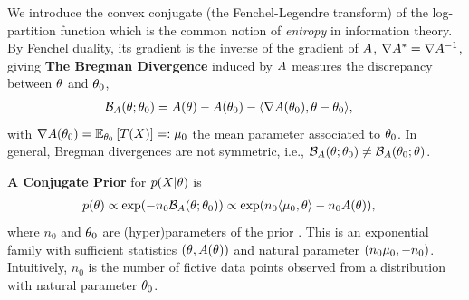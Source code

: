 We introduce the convex conjugate (the Fenchel-Legendre transform) of the log-partition function
which is the common notion of \textit{entropy} in information theory.
By Fenchel duality, its gradient is the inverse of the gradient of $\logpart$,  $\nabla\conj=\nabla\logpart^{-1}$, giving
%
{\bf The Bregman Divergence} induced by $\logpart$ measures the discrepancy between $\nat$ and $\nat_0$,
\begin{align}
    \bregman (\nat ; \nat_0)
    & = \logpart(\nat) - \logpart(\nat_0)
    - \langle \nabla \logpart(\nat_0)  , \nat - \nat_0 \rangle,
    \label{eq:defBregman}
\end{align}
with $\nabla \logpart(\nat_0) = \expect[\nat_0]{T(X)} =: \meanp_0$ the mean parameter associated to $\nat_0$.
In general, Bregman divergences are not symmetric, i.e., $\bregman (\nat ; \nat_0)\neq \bregman (\nat_0 ; \nat)$.

{\bf A Conjugate Prior} for $p(X|\nat)$ is
\begin{align}
    p(\nat)
    &\propto \exp( - n_0 \bregman(\nat ; \nat_0) ) \propto \exp(n_0 \langle \m_0, \nat \rangle - n_0 \logpart(\nat)),
    \label{eq:def_prior}
\end{align}
where $n_0$ and $\nat_0$ are (hyper)parameters of the prior  \citep{agarwal2010geometric}.
This is an exponential family with sufficient statistics $(\nat ,\logpart(\nat))$ and natural parameter $(n_0 \m_0, -n_0)$.
Intuitively, $n_0$ is the number of fictive data points observed from a distribution with natural parameter $\nat_0$.

